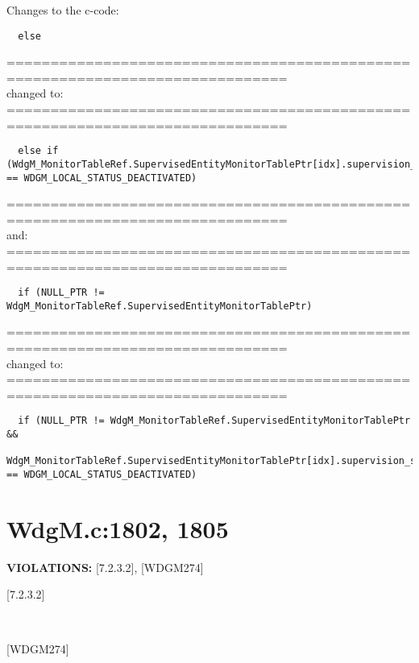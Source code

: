 \documentclass[11pt,a4paper]{article}
\begin{document}
\lstset{language=c}

Changes to the c-code:
\begin{lstlisting}
  else
\end{lstlisting}
==============================================================================\\
changed to:\\
==============================================================================
\begin{lstlisting}
  else if (WdgM_MonitorTableRef.SupervisedEntityMonitorTablePtr[idx].supervision_status == WDGM_LOCAL_STATUS_DEACTIVATED)
\end{lstlisting}
==============================================================================\\
and:\\
==============================================================================
\begin{lstlisting}
  if (NULL_PTR != WdgM_MonitorTableRef.SupervisedEntityMonitorTablePtr)
\end{lstlisting}
==============================================================================\\
changed to:\\
==============================================================================
\begin{lstlisting}
  if (NULL_PTR != WdgM_MonitorTableRef.SupervisedEntityMonitorTablePtr &&
  WdgM_MonitorTableRef.SupervisedEntityMonitorTablePtr[idx].supervision_status == WDGM_LOCAL_STATUS_DEACTIVATED)
\end{lstlisting}
\newpage

\section{WdgM.c:1802, 1805}
\textbf{VIOLATIONS:} [7.2.3.2], [WDGM274]

\lstset{language=autosar}

[7.2.3.2]
\begin{lstlisting}

\end{lstlisting}~\\

[WDGM274]
\begin{lstlisting}
\end{lstlisting}~\\
\end{document}
